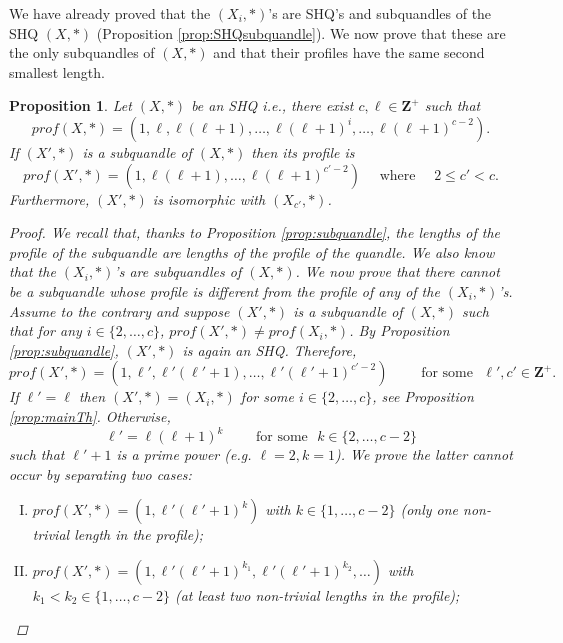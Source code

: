 \documentclass{article}
\newtheorem{proposition}[theorem]{Proposition}
\begin{document}
We have already proved that the $(X_i, \ast )$'s are SHQ's and subquandles of the SHQ $(X, \ast)$ (Proposition \ref{prop:SHQsubquandle}). We now prove that these are the only subquandles of $(X, \ast)$ and that their profiles have the same second smallest length.


\begin{proposition}\label{prop:subquandle2}
Let $(X, \ast)$ be an SHQ i.e., there exist $c, \ell\in \mathbf{Z}^+$ such that $$prof(X, \ast) = (1, \ell, \ell(\ell+1), \dots , \ell(\ell+1)^i, \dots , \ell(\ell+1)^{c-2}) .$$ If $(X', \ast)$ is a subquandle of $(X, \ast)$ then its profile is $$prof(X', \ast)= (1, \ell(\ell+1), \dots , \ell(\ell+1)^{c'-2}) \quad \text{ where } \quad 2\leq c' <c .$$ Furthermore, $(X', \ast)$ is isomorphic with $(X_{c'}, \ast)$.
\begin{proof}
We recall that, thanks to Proposition \ref{prop:subquandle}, the lengths of the profile of the subquandle are lengths of the profile of the quandle. We also know that the $(X_i, \ast)$'s are subquandles of $(X, \ast)$. We now prove that there cannot be a  subquandle whose profile is different from the profile of any of the $(X_i,*)$'s. Assume to the contrary and suppose $(X',*)$ is a subquandle of $(X, *)$ such that for any $i\in \{2, \dots , c\}$, $prof(X', *)\neq prof(X_i, *)$. By Proposition \ref{prop:subquandle}, $(X', *)$ is again an SHQ. Therefore, $$prof(X', *)=(1, \ell', \ell'(\ell'+1), \dots , \ell'(\ell'+1)^{c'-2})\qquad \text{ for some }\,\,\ell', c'\in \mathbf{Z}^+ .$$If $\ell'=\ell$ then $(X', *)=(X_i, *)$ for some $i\in \{2, \dots, c\}$, see Proposition \ref{prop:mainTh}. Otherwise, $$\ell'=\ell(\ell+1)^k \qquad \text{ for some }\,\,k\in\{2, \dots , c-2\} $$such that $\ell'+1$ is a prime power (e.g. $\ell=2, k=1$). We prove the latter cannot occur by separating two cases:
\begin{enumerate}[I.]
\item $prof(X', *)=(1,  \ell'(\ell'+1)^{k})$ with $k\in \{ 1, \dots , c-2\}$ (only one non-trivial length in the profile);
\item $prof(X', *)=(1,  \ell'(\ell'+1)^{k_1},  \ell'(\ell'+1)^{k_2}, \dots )$ with $k_1<k_2\in \{ 1, \dots , c-2\}$ (at least two non-trivial lengths in the profile);
\end{enumerate}




\end{proof}
\end{proposition}
\end{document}
